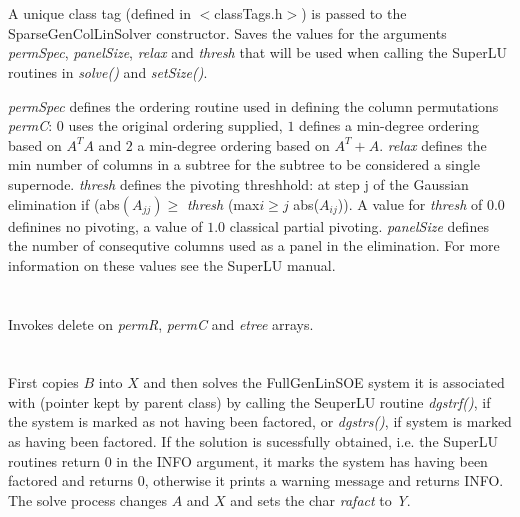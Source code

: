   \\
  \\
A unique class tag (defined in $<$classTags.h$>$) is passed to the
SparseGenColLinSolver constructor. Saves the values for the arguments
{\em permSpec}, {\em panelSize}, {\em relax} and {\em thresh} that
will be used when calling the SuperLU routines in {\em solve()} and
{\em setSize()}.

{\em permSpec} defines the ordering routine used in defining the
column permutations {\em permC}: $0$ uses the original ordering
supplied, $1$ defines a min-degree ordering based on $A^TA$ and $2$ a
min-degree ordering based on $A^T + A$. {\em relax} defines the min
number of columns in a subtree for the subtree to be considered a
single supernode. {\em thresh} defines the pivoting threshhold: at
step j of the Gaussian elimination if (abs$(A_{jj}) \ge$ {\em thresh}
(max$ i \ge j$ abs($A_{ij}$)). A value for {\em thresh} of $0.0$
definines no pivoting, a value of $1.0$ classical partial pivoting.
{\em panelSize} defines the number of consequtive columns used as a
panel in the elimination. For more information on these values see the
SuperLU manual. \\


 \\
\\ 
Invokes delete on {\em permR}, {\em permC} and {\em etree} arrays. \\


  \\
 \\
First copies $B$ into $X$ and then solves the FullGenLinSOE system 
it is associated with (pointer kept by parent class) by calling the SeuperLU
routine {\em dgstrf()}, if the system is marked as not having been factored,
or {\em dgstrs()}, if system is marked as having been factored. If the
solution is sucessfully obtained, i.e. the SuperLU routines return $0$
in the INFO argument, it marks the system has having been
factored and returns $0$, otherwise it prints a warning message and
returns INFO. The solve process changes $A$ and $X$ and sets the char
{\em rafact} to {\em Y}. \\   

